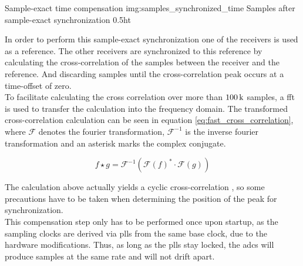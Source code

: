 \begin{subchapter}{Sample-exact time compensation}
               {img:samples_synchronized_time}
               {Samples after sample-exact synchronization}
               {0.5}{ht}

  In order to perform this sample-exact synchronization
  one of the receivers is used as a reference.
  The other receivers are synchronized to this reference
  by calculating the cross-correlation of the samples between
  the receiver and the reference.
  And discarding samples until the cross-correlation peak
  occurs at a time-offset of zero. \\

  To facilitate calculating the cross correlation over
  more than $\SI{100}{\kilo\relax}$ samples, a \acrlong{fft}
  is used to transfer the calculation into the frequency domain.
  The transformed cross-correlation calculation can be
  seen in equation \ref{eq:fast_cross_correlation}, where
  $\mathcal{F}$ denotes the fourier transformation,
  $\mathcal{F}^{-1}$ is the inverse fourier transformation
  and an asterisk marks the complex conjugate.

  \begin{equation}
    \label{eq:fast_cross_correlation}
    f \star g = \mathcal{F}^{-1}\left(
      \mathcal{F}\left( f \right)^{\ast}
      \cdot
      \mathcal{F}\left( g \right)
    \right)
  \end{equation}

  The calculation above actually yields a
  cyclic cross-correlation \cite[p. 329]{kammeyer2012},
  so some precautions have to be taken when
  determining the position of the peak for
  synchronization. \\

  This compensation step only has to be performed
  once upon startup, as the sampling clocks are
  derived via \glspl{pll} from the same base clock,
  due to the hardware modifications.
  Thus, as long as the \glspl{pll} stay locked,
  the \glspl{adc} will produce samples at the
  same rate and will not drift apart.
\end{subchapter}

